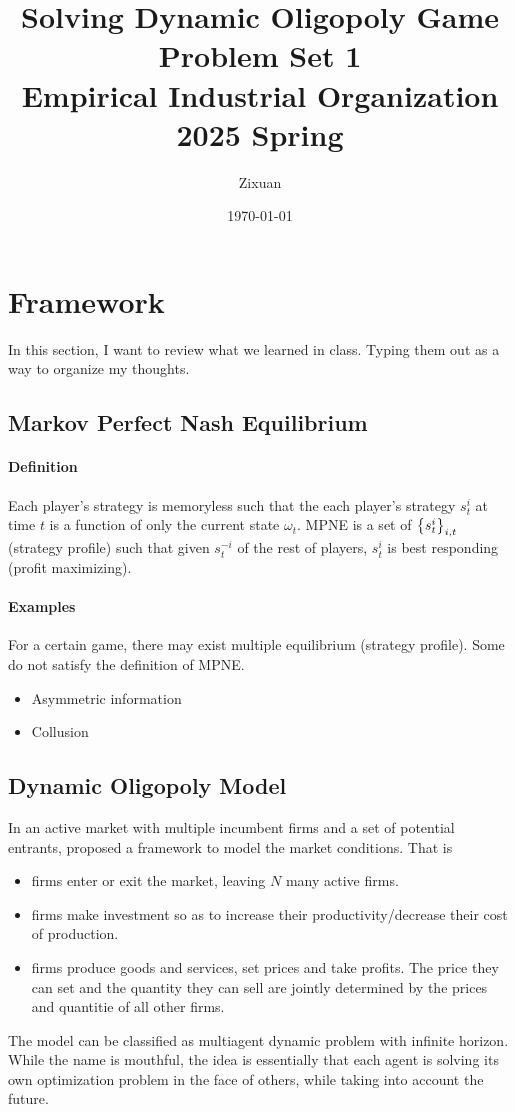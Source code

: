 \documentclass[12pt]{article}[margin=1in]
\title{\textbf{Solving Dynamic Oligopoly Game} \\
    \vspace{.3cm}
    \large Problem Set 1 \\
    Empirical Industrial Organization 2025 Spring}
\author{Zixuan}
\date{\today}
\begin{document}
\maketitle

\setcounter{page}{1}

\section{Framework}
In this section, I want to review what we learned in class. Typing them out as a way to organize my thoughts.
\subsection{Markov Perfect Nash Equilibrium}
\paragraph{Definition}
Each player's strategy is memoryless such that the each player's strategy $s_t^i$ at time $t$ is a function of only the current state $\omega_t$.
MPNE is a set of $\left\{s_t^i\right\}_{i,t}$ (strategy profile) such that given $s_t^{-i}$ of the rest of players, $s_t^i$ is best responding (profit maximizing).
\paragraph{Examples}
For a certain game, there may exist multiple equilibrium (strategy profile). Some do not satisfy the definition of MPNE.
\begin{itemize}
    \item Asymmetric information 
    \item Collusion
\end{itemize}

\subsection{Dynamic Oligopoly Model}
In an active market with multiple incumbent firms and a set of potential entrants, \citet{ericson1995markov} proposed a framework to model the market conditions. That is
\begin{itemize}
    \item firms enter or exit the market, leaving $N$ many active firms.
    \item firms make investment so as to increase their productivity/decrease their cost of production.
    \item firms produce goods and services, set prices and take profits. The price they can set and the quantity they can sell are jointly determined by the prices and quantitie of all other firms.
\end{itemize} 
The model can be classified as multiagent dynamic problem with infinite horizon. While the name is mouthful, the idea is essentially that each agent is solving its own optimization problem in the face of others, while taking into account the future. 
\end{document}
